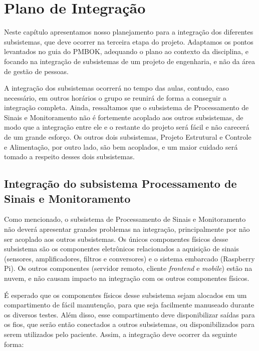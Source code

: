 \chapter{Plano de Integração}
\label{chapter:plano}

Neste capítulo apresentamos nosso planejamento para a integração dos diferentes
subsistemas, que deve ocorrer na terceira etapa do projeto. Adaptamos os pontos
levantados no guia do PMBOK, adequando o plano ao contexto da disciplina, e
focando na integração de subsistemas de um projeto de engenharia, e não da área
de gestão de pessoas.

A integração dos subsistemas ocorrerá no tempo das aulas, contudo, caso
necessário, em outros horários o grupo se reunirá de forma a conseguir a
integração completa. Ainda, ressaltamos que o subsistema de Processamento de
Sinais e Monitoramento não é fortemente acoplado aos outros subsistemas, de
modo que a integração entre ele e o restante do projeto será fácil e não
carecerá de um grande esforço. Os outros dois subsistemas, Projeto Estrutural
e Controle e Alimentação, por outro lado, são bem acoplados, e um maior cuidado
será tomado a respeito desses dois subsistemas.

\section{Integração do subsistema Processamento de Sinais e Monitoramento}

Como mencionado, o subsistema de Processamento de Sinais e Monitoramento não
deverá apresentar grandes problemas na integração, principalmente por não ser
acoplado aos outros subsistemas. Os únicos componentes físicos desse subsistema
são os componentes eletrônicos relacionados a aquisição de sinais (sensores,
amplificadores, filtros e conversores) e o sistema embarcado (Raspberry Pi).
Os outros componentes (servidor remoto, cliente \textit{frontend} e
\textit{mobile}) estão na nuvem, e não causam impacto na integração com os
outros componentes físicos.

É esperado que os componentes físicos desse subsistema sejam alocados em um
compartimento de fácil manutenção, para que seja facilmente manuseado durante
os diversos testes. Além disso, esse compartimento deve disponibilizar saídas
para os fios, que serão então conectados a outros subsistemas, ou
disponibilizados para serem utilizados pelo paciente. Assim, a integração deve
ocorrer da seguinte forma:

